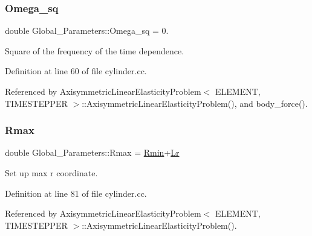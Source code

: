 \mbox{\label{namespaceGlobal__Parameters_af9e1e178dfb7f5e35b452599bd4c4324}} 
\subsubsection{\texorpdfstring{Omega\+\_\+sq}{Omega\_sq}}
{\footnotesize\ttfamily double Global\+\_\+\+Parameters\+::\+Omega\+\_\+sq = 0.}



Square of the frequency of the time dependence. 



Definition at line 60 of file cylinder.\+cc.



Referenced by Axisymmetric\+Linear\+Elasticity\+Problem$<$ E\+L\+E\+M\+E\+N\+T, T\+I\+M\+E\+S\+T\+E\+P\+P\+E\+R $>$\+::\+Axisymmetric\+Linear\+Elasticity\+Problem(), and body\+\_\+force().

\mbox{\label{namespaceGlobal__Parameters_a06f5ea713550f61da323eafb91fceedd}} 
\subsubsection{\texorpdfstring{Rmax}{Rmax}}
{\footnotesize\ttfamily double Global\+\_\+\+Parameters\+::\+Rmax = \hyperlink{namespaceGlobal__Parameters_ab0e73c8b2e1105b14203856b81efa8cf}{Rmin}+\hyperlink{namespaceGlobal__Parameters_a444f5c911c8805ad2ba45ed8b1b8904e}{Lr}}



Set up max r coordinate. 



Definition at line 81 of file cylinder.\+cc.



Referenced by Axisymmetric\+Linear\+Elasticity\+Problem$<$ E\+L\+E\+M\+E\+N\+T, T\+I\+M\+E\+S\+T\+E\+P\+P\+E\+R $>$\+::\+Axisymmetric\+Linear\+Elasticity\+Problem().

\mbox{\label{namespaceGlobal__Parameters_ab0e73c8b2e1105b14203856b81efa8cf}} 
